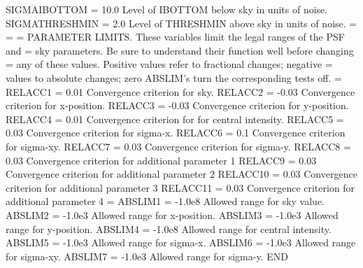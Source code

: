 {{SIGMAIBOTTOM = 10.0    Level of IBOTTOM below sky in units of noise.
SIGMATHRESHMIN = 2.0   Level of THRESHMIN above sky in units of noise.
=
=
=  PARAMETER LIMITS.  These variables limit the legal ranges of the PSF and 
=  sky parameters.  Be sure to understand their function well before changing 
=  any of these values.  Positive values refer to fractional changes; negative
=  values to absolute changes; zero ABSLIM's turn the corresponding tests off.
=
RELACC1 = 0.01         Convergence criterion for sky.
RELACC2 = -0.03        Convergence criterion for x-position.
RELACC3 = -0.03        Convergence criterion for y-position.
RELACC4 = 0.01         Convergence criterion for for central intensity.
RELACC5 = 0.03         Convergence criterion for sigma-x.
RELACC6 = 0.1          Convergence criterion for sigma-xy.
RELACC7 = 0.03         Convergence criterion for sigma-y.
RELACC8 = 0.03         Convergence criterion for additional parameter 1
RELACC9 = 0.03         Convergence criterion for additional parameter 2
RELACC10 = 0.03        Convergence criterion for additional parameter 3
RELACC11 = 0.03        Convergence criterion for additional parameter 4
=
ABSLIM1 = -1.0e8       Allowed range for sky value.
ABSLIM2 = -1.0e3       Allowed range for x-position.
ABSLIM3 = -1.0e3       Allowed range for y-position.
ABSLIM4 = -1.0e8       Allowed range for central intensity.
ABSLIM5 = -1.0e3       Allowed range for sigma-x.
ABSLIM6 = -1.0e3       Allowed range for sigma-xy.
ABSLIM7 = -1.0e3       Allowed range for sigma-y.
END
}
}
\vfill
\eject